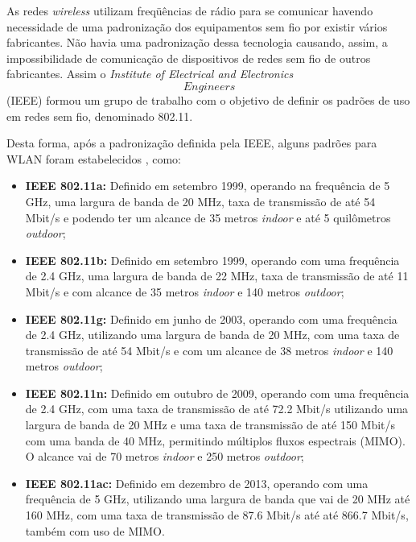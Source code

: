 \documentclass[
	12pt,				%
	twoside,			%
	a4paper,			%
	english,			%
	french,				%
	spanish,			%
	brazil				%
	]{abntex2}
\begin{document}
\begin{citacao}
    As redes \textit{wireless} utilizam freqüências de rádio para se comunicar
    havendo necessidade de uma padronização dos equipamentos sem fio por
    existir vários fabricantes. Não havia uma padronização dessa tecnologia
    causando, assim, a impossibilidade de comunicação de dispositivos de
    redes sem fio de outros fabricantes. Assim o \textit{Institute of Electrical
    and Electronics \[Engineers\]} (IEEE) formou um grupo de trabalho com o
    objetivo de definir os padrões de uso em redes sem fio, denominado
    802.11. 
\end{citacao}

Desta forma, após a padronização definida pela IEEE, alguns padrões para
WLAN foram estabelecidos \cite{RIVERA,BANERJI}, como:

\begin{itemize}
\item
  \textbf{IEEE 802.11a:} Definido em setembro 1999, operando na
  frequência de 5 GHz, uma largura de banda de 20 MHz, taxa de
  transmissão de até 54 Mbit/s e podendo ter um alcance de 35 metros
  \emph{indoor} e até 5 quilômetros \emph{outdoor};
\item
  \textbf{IEEE 802.11b:} Definido em setembro 1999, operando com uma
  frequência de 2.4 GHz, uma largura de banda de 22 MHz, taxa de
  transmissão de até 11 Mbit/s e com alcance de 35 metros \emph{indoor}
  e 140 metros \emph{outdoor};
\item
  \textbf{IEEE 802.11g:} Definido em junho de 2003, operando com uma
  frequência de 2.4 GHz, utilizando uma largura de banda de 20 MHz, com
  uma taxa de transmissão de até 54 Mbit/s e com um alcance de 38 metros
  \emph{indoor} e 140 metros \emph{outdoor};
\item
  \textbf{IEEE 802.11n:} Definido em outubro de 2009, operando com uma
  frequência de 2.4 GHz, com uma taxa de transmissão de até 72.2 Mbit/s
  utilizando uma largura de banda de 20 MHz e uma taxa de transmissão de
  até 150 Mbit/s com uma banda de 40 MHz, permitindo múltiplos fluxos
  espectrais (MIMO). O alcance vai de 70 metros \emph{indoor} e 250
  metros \emph{outdoor};
\item
  \textbf{IEEE 802.11ac:} Definido em dezembro de 2013, operando com uma
  frequência de 5 GHz, utilizando uma largura de banda que vai de 20 MHz
  até 160 MHz, com uma taxa de transmissão de 87.6 Mbit/s até até 866.7
  Mbit/s, também com uso de MIMO.
\end{itemize}
\end{document}
